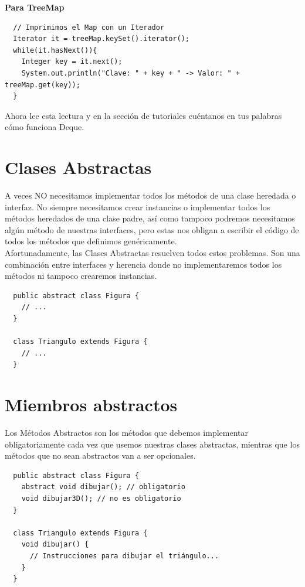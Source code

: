 \documentclass{article}
\begin{document}
\textbf{Para TreeMap}

\begin{verbatim}
  // Imprimimos el Map con un Iterador
  Iterator it = treeMap.keySet().iterator();
  while(it.hasNext()){
    Integer key = it.next();
    System.out.println("Clave: " + key + " -> Valor: " + treeMap.get(key));
  }
\end{verbatim}

Ahora lee esta lectura y en la sección de tutoriales cuéntanos en tus palabras
cómo funciona Deque.


\section{Clases Abstractas}%
A veces NO necesitamos implementar todos los métodos de una clase heredada o
interfaz. No siempre necesitamos crear instancias o implementar todos los
métodos heredados de una clase padre, así como tampoco podremos necesitamos
algún método de nuestras interfaces, pero estas nos obligan a escribir el
código de todos los métodos que definimos genéricamente.\\

Afortunadamente, las Clases Abstractas resuelven todos estos problemas. Son una
combinación entre interfaces y herencia donde no implementaremos todos los
métodos ni tampoco crearemos instancias.\\

\begin{verbatim}
  public abstract class Figura {
    // ...
  }

  class Triangulo extends Figura {
    // ...
  }
\end{verbatim}


\section{Miembros abstractos}%
Los Métodos Abstractos son los métodos que debemos implementar obligatoriamente
cada vez que usemos nuestras clases abstractas, mientras que los métodos que no
sean abstractos van a ser opcionales.\\

\begin{verbatim}
  public abstract class Figura {
    abstract void dibujar(); // obligatorio
    void dibujar3D(); // no es obligatorio
  }

  class Triangulo extends Figura {
    void dibujar() {
      // Instrucciones para dibujar el triángulo...
    }
  }
\end{verbatim}
\end{document}
